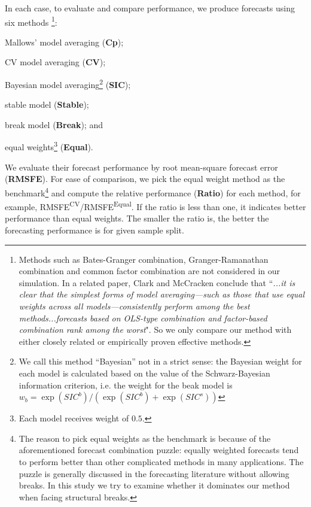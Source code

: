 In each case, to evaluate and compare performance, we produce forecasts using six methods \footnote{Methods such as Bates-Granger combination, Granger-Ramanathan combination and common factor combination are not considered in our simulation. In a related paper, Clark and McCracken \cite{clark_mccracken_averagingVAR_2008} conclude that ``\emph{...it is clear that the simplest forms of model averaging---such as those that use equal weights across all models---consistently perform among the best methods...forecasts based on OLS-type combination and factor-based combination rank among the worst}". So we only compare our method with either closely related or empirically proven effective methods.}:
\begin{inparaenum}[(i)]
\item Mallows' model averaging (\textbf{Cp});
\item CV model averaging (\textbf{CV});
\item Bayesian model averaging\footnote{We call this method ``Bayesian'' not in a strict sense: the Bayesian weight for each model is calculated based on the value of the Schwarz-Bayesian information criterion, i.e. the weight for the beak model is $w_{b} = \exp{(SIC^{b})}/(\exp{(SIC^{b})} + \exp{(SIC^{s})})$} (\textbf{SIC});
\item stable model (\textbf{Stable});
\item break model (\textbf{Break}); and
\item equal weights\footnote{Each model receives weight of $0.5$.} (\textbf{Equal}).
\end{inparaenum}
We evaluate their forecast performance by root mean-square forecast error (\textbf{RMSFE}). For ease of comparison, we pick the equal weight method as the benchmark\footnote{The reason to pick equal weights as the benchmark is because of the aforementioned forecast combination puzzle: equally weighted forecasts tend to perform better than other complicated methods in many applications. The puzzle is generally discussed in the forecasting literature without allowing breaks. In this study we try to examine whether it dominates our method when facing structural breaks.} and compute the relative performance (\textbf{Ratio}) for each method, for example, RMSFE\textsuperscript{CV}/RMSFE\textsuperscript{Equal}. If the ratio is less than one, it indicates better performance than equal weights. The smaller the ratio is, the better the forecasting performance is for given sample split.
